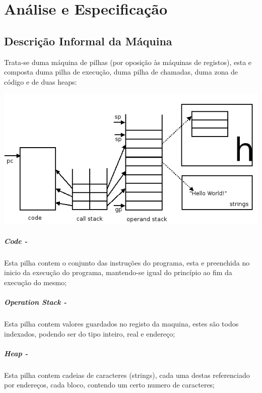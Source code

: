 \documentclass{report}
\begin{document}
\chapter{Análise e Especificação} \label{ae}
\section{Descrição Informal da Máquina}

\quad Trata-se duma máquina de pilhas (por oposição às máquinas de registos), esta e composta duma pilha de execução, duma pilha de chamadas,
duma zona de código e de duas heaps:

\begin{center}
\includegraphics{stacks.png}
\end{center}

\paragraph{\quad Code -}
Esta pilha contem o conjunto das instruções do programa, esta e preenchida no inicio da execução do programa, mantendo-se igual
do princípio ao fim da execução do mesmo;
\paragraph{\quad Operation Stack -}
Esta pilha contem valores guardados no registo da maquina, estes são todos indexados, podendo ser do tipo inteiro, real e endereço;
\paragraph{\quad Heap -}
Esta pilha contem cadeias de caracteres (strings), cada uma destas referenciado por endereços, cada bloco,
contendo um certo numero de caracteres;
\end{document}
